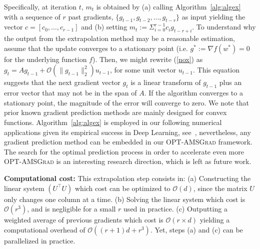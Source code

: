 \documentclass[wcp]{jmlr}
\begin{document}
Specifically, at iteration $t$, $m_t$ is obtained by \textsf{(a)} calling Algorithm~\ref{alg:algex} with a sequence of $r$ past gradients, $\{ g_{t-1},g_{t-2}, \dots, g_{t-r} \}$ as input yielding the vector $c = [c_0, \dots, c_{r-1}] $ and \textsf{(b)} setting $m_t:= \Sigma_{i=0}^{r-1} c_i g_{t-r+i}$.
To understand why the output from the extrapolation method may be a reasonable estimation, assume that the update converges to a stationary point (i.e. $g^*:=\nabla f(w^*) = 0$ for the underlying function $f$). Then, we might rewrite (\ref{nox}) as $g_t = A g_{t-1}  + \mathcal{O}( \| g_{t-1} \|_2^2 ) u_{t-1}$, for some unit vector $u_{t-1}$.
This equation suggests that the next gradient vector $g_{t}$ is a linear transform of $g_{{t-1}}$ plus an error vector that may not be in the span of $A$.
If the algorithm converges to a stationary point, the magnitude of the error will converge to zero. 
We note that prior known gradient prediction methods are mainly designed for convex functions.
Algorithm~\ref{alg:algex} is employed in our following numerical applications given its empirical success in Deep Learning, see~\cite{Scieur18}, nevertheless, any gradient prediction method can be embedded in our \textsc{OPT-AMSGrad} framework.
The search for the optimal prediction process in order to accelerate even more \textsc{OPT-AMSGrad} is an interesting research direction, which is left as future work.

\textbf{Computational cost:}
 This extrapolation step consists in: \textsf{(a)} Constructing the linear system $(U^\top U)$ which cost can be optimized to $\mathcal{O}(d)$, since the matrix $U$ only changes one column at a time. \textsf{(b)} Solving the linear system which cost is $\mathcal{O}(r^3)$, and is negligible for a small $r$ used in practice.\textsf{ (c)} Outputting a weighted average of previous gradients which cost is $\mathcal{O}(r \times d)$ yielding a computational overhead of $\mathcal O\left((r+1)d+r^3\right)$.
Yet, steps \textsf{(a)} and \textsf{(c)} can be parallelized in practice.
\end{document}
